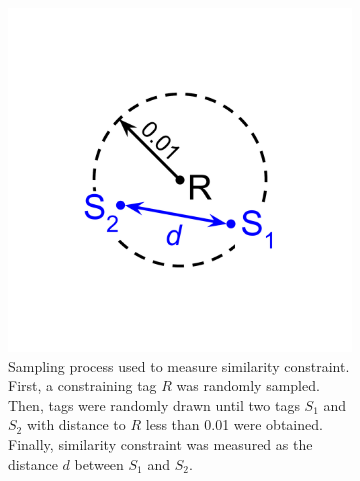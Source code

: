 \begin{figure}
\begin{center}

\begin{minipage}{\linewidth}
\begin{subfigure}[b]{\linewidth}
\begin{minipage}{0.5\textwidth}
\begin{center}
\includegraphics[width=0.5\linewidth,trim=5cm 5cm 5cm 5cm, clip]{img/dimensionality-statistic}
\end{center}
\end{minipage}%
\begin{minipage}{0.5\textwidth}
\caption{
Sampling process used to measure similarity constraint.
First, a constraining tag $R$ was randomly sampled.
Then, tags were randomly drawn until two tags $S_1$ and $S_2$ with distance to $R$ less than 0.01 were obtained.
Finally, similarity constraint was measured as the distance $d$ between $S_1$ and $S_2$.
}
\label{fig:dimensionality_measure}
\end{minipage}
\end{subfigure}
\end{minipage}
\begin{subfigure}[b]{\linewidth}
\begin{minipage}{0.6\linewidth}

\end{minipage}
\end{subfigure}
\end{center}
\end{figure}
